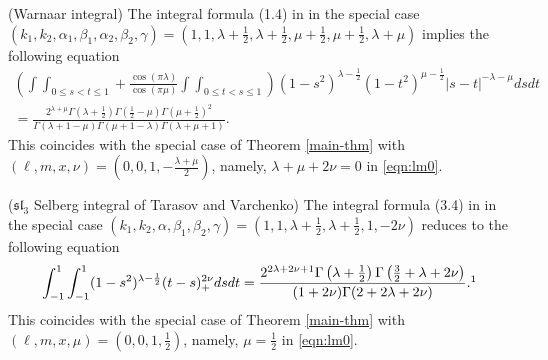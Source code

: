 \documentclass[12pt]{article}
\numberwithin{equation}{section}
\newcommand{\comma}{{,}}
\begin{document}
\begin{example}
  \label{ex:2}(Warnaar integral) The integral formula (1.4) in
  {\cite{warnaar2010sl3}} in the special case $(k_1, k_2, \alpha_1, \beta_1,
  \alpha_2 \comma \beta_2, \gamma) = \left( 1, 1, \lambda + \frac{1}{2},
  \lambda + \frac{1}{2}, \mu + \frac{1}{2}, \mu + \frac{1}{2} \comma \lambda +
  \mu \right)$ implies the following equation
  \begin{multline}
     \left( \displaystyle\int \displaystyle\int_{0 \leqslant s < t
    \leqslant 1} + \frac{\cos (\pi \lambda)}{\cos (\pi \mu)} \displaystyle\int \displaystyle\int_{0
    \leqslant t < s \leqslant 1} \right) (1 - s^2)^{\lambda - \frac{1}{2}} (1
    - t^2)^{\mu - \frac{1}{2}} | s - t |^{- \lambda - \mu} d s d t
    \\
    \displaystyle= \frac{{2^{\lambda + \mu}}\Gamma \left( \lambda + \frac{1}{2} \right) \Gamma \left(
    \frac{1}{2} - \mu \right) \Gamma \left( \mu + \frac{1}{2}
    \right)^2}{\Gamma (\lambda + 1 - \mu) \Gamma (\mu + 1 - \lambda) \Gamma
    (\lambda + \mu + 1)}.
      \label{eqn:spec_warnaar}
  \end{multline}
  This coincides with the special case of Theorem \ref{main-thm} with $(\ell,
  m, x, \nu) = \left( 0, 0, 1, - \frac{\lambda + \mu}{2} \right)$, namely,
  $\lambda+\mu+2\nu=0$ in
  \eqref{eqn:lm0}.
\end{example}

\begin{example}
  \label{ex:3}($\mathfrak{s}\mathfrak{l}_3$ Selberg integral of Tarasov and
  Varchenko) The integral formula (3.4) in {\cite{tarasov2003selberg}} in the
  special case $(k_1, k_2, \alpha, \beta_1, \beta_2, \gamma) = \left( 1, 1,
  \lambda + \frac{1}{2}, \lambda + \frac{1}{2}, 1, - 2 \nu \right)$ reduces to
  the following equation
  \begin{equation}
    \displaystyle\displaystyle\int_{- 1}^1 \displaystyle\int_{- 1}^1 (1 -
    s^2)^{\lambda - \frac{1}{2}} (t - s)_+^{2 \nu} d s d t = \frac{2^{2\lambda+2\nu+1}\Gamma
    \left( \lambda + \frac{1}{2} \right) \Gamma \left( \frac{3}{2} + \lambda +
2 \nu \right)}{(1 + 2 \nu) \Gamma (2 + 2 \lambda + 2 \nu)} \mbox{.\footnotemark}
\label{eqn:spec_tv}
  \end{equation}
  This coincides with the special case of Theorem \ref{main-thm} with $(\ell,
  m, x, \mu) = \left( 0, 0, 1, \frac{1}{2} \right)$, namely, $\mu=\frac{1}{2}$ in \eqref{eqn:lm0}.
\end{example}
\end{document}
